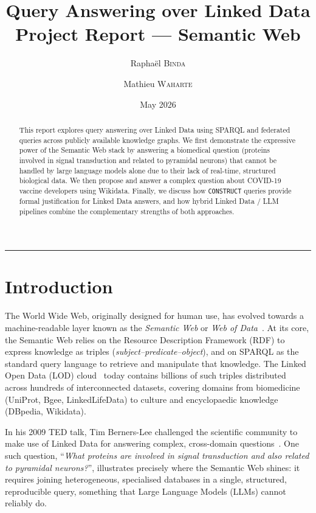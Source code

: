 \documentclass[12pt,a4paper]{article}
\title{
  \Large \textbf{Query Answering over Linked Data}\\[0.4em]
  \large Project Report --- Semantic Web
}
\author{
  Raphaël \textsc{Binda} \and Mathieu \textsc{Waharte}
}
\date{May 2026}
\begin{document}
\maketitle
\thispagestyle{fancy}

\begin{abstract}
This report explores query answering over Linked Data using SPARQL and federated
queries across publicly available knowledge graphs.
We first demonstrate the expressive power of the Semantic Web stack by answering
a biomedical question (proteins involved in signal transduction and related to
pyramidal neurons) that cannot be handled by large language models alone due to
their lack of real-time, structured biological data.
We then propose and answer a complex question about COVID-19 vaccine developers using Wikidata.
Finally, we discuss how \texttt{CONSTRUCT} queries provide formal justification
for Linked Data answers, and how hybrid Linked Data / LLM pipelines combine the
complementary strengths of both approaches.
\end{abstract}

\vspace{0.5em}
\noindent\rule{\linewidth}{0.4pt}
\tableofcontents
\vspace{1em}

\newpage
\section{Introduction}
\label{sec:intro}
The World Wide Web, originally designed for human use, has evolved
towards a machine-readable layer known as the \emph{Semantic Web} or
\emph{Web of Data}~\cite{bernerslee2001}.
At its core, the Semantic Web relies on the Resource Description Framework
(RDF) to express knowledge as triples (\emph{subject--predicate--object}),
and on SPARQL as the standard query language to retrieve and manipulate that
knowledge.
The Linked Open Data (LOD) cloud~\cite{lodcloud} today contains billions of
such triples distributed across hundreds of interconnected datasets, covering
domains from biomedicine (UniProt, Bgee, LinkedLifeData) to culture and
encyclopaedic knowledge (DBpedia, Wikidata).

In his 2009 TED talk, Tim Berners-Lee challenged the scientific community to
make use of Linked Data for answering complex, cross-domain questions~\cite{tbl2009}.
One such question, ``\textit{What proteins are involved in signal
transduction and also related to pyramidal neurons?}'', illustrates
precisely where the Semantic Web shines: it requires joining
heterogeneous, specialised databases in a single, structured, reproducible
query, something that Large Language Models (LLMs) cannot reliably do.
\end{document}
